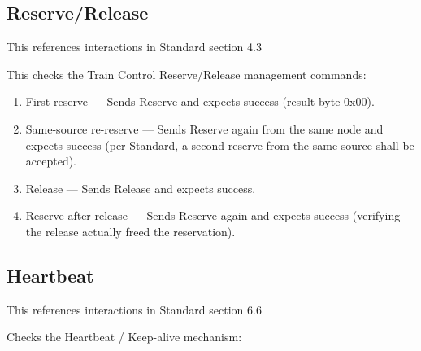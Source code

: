 \subsection{Reserve/Release}

This references interactions in Standard section 4.3

This checks the Train Control Reserve/Release management commands:

\begin{enumerate}

\item First reserve — Sends Reserve and expects success (result byte 0x00).

\item Same-source re-reserve — Sends Reserve again from the same node and
expects success (per Standard, a second reserve from the same source
shall be accepted).

\item Release — Sends Release and expects success.

\item Reserve after release — Sends Reserve again and expects success
(verifying the release actually freed the reservation).

\end{enumerate}


\subsection{Heartbeat}

This references interactions in Standard section 6.6

Checks the Heartbeat / Keep-alive mechanism:

